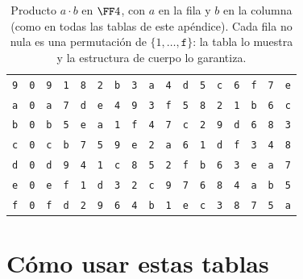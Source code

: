 \begin{table}[htbp]
\begin{tabular}{@{}c@{}c@{}c@{}c@{}c@{}c@{}c@{}c@{}c@{}c@{}c@{}c@{}c@{}c@{}c@{}c@{}c@{}}
\texttt{9} & \texttt{0} & \texttt{9} & \texttt{1} & \texttt{8} & \texttt{2} & \texttt{b} & \texttt{3} & \texttt{a} & \texttt{4} & \texttt{d} & \texttt{5} & \texttt{c} & \texttt{6} & \texttt{f} & \texttt{7} & \texttt{e}\\
\texttt{a} & \texttt{0} & \texttt{a} & \texttt{7} & \texttt{d} & \texttt{e} & \texttt{4} & \texttt{9} & \texttt{3} & \texttt{f} & \texttt{5} & \texttt{8} & \texttt{2} & \texttt{1} & \texttt{b} & \texttt{6} & \texttt{c}\\
\texttt{b} & \texttt{0} & \texttt{b} & \texttt{5} & \texttt{e} & \texttt{a} & \texttt{1} & \texttt{f} & \texttt{4} & \texttt{7} & \texttt{c} & \texttt{2} & \texttt{9} & \texttt{d} & \texttt{6} & \texttt{8} & \texttt{3}\\
\texttt{c} & \texttt{0} & \texttt{c} & \texttt{b} & \texttt{7} & \texttt{5} & \texttt{9} & \texttt{e} & \texttt{2} & \texttt{a} & \texttt{6} & \texttt{1} & \texttt{d} & \texttt{f} & \texttt{3} & \texttt{4} & \texttt{8}\\
\texttt{d} & \texttt{0} & \texttt{d} & \texttt{9} & \texttt{4} & \texttt{1} & \texttt{c} & \texttt{8} & \texttt{5} & \texttt{2} & \texttt{f} & \texttt{b} & \texttt{6} & \texttt{3} & \texttt{e} & \texttt{a} & \texttt{7}\\
\texttt{e} & \texttt{0} & \texttt{e} & \texttt{f} & \texttt{1} & \texttt{d} & \texttt{3} & \texttt{2} & \texttt{c} & \texttt{9} & \texttt{7} & \texttt{6} & \texttt{8} & \texttt{4} & \texttt{a} & \texttt{b} & \texttt{5}\\
\texttt{f} & \texttt{0} & \texttt{f} & \texttt{d} & \texttt{2} & \texttt{9} & \texttt{6} & \texttt{4} & \texttt{b} & \texttt{1} & \texttt{e} & \texttt{c} & \texttt{3} & \texttt{8} & \texttt{7} & \texttt{5} & \texttt{a}\\
\bottomrule
\end{tabular}
\caption{Producto $a\cdot b$ en $\FF4$, con $a$ en la fila y $b$ en la
columna (como en todas las tablas de este apéndice). Cada fila no
nula es una permutación de $\{1,\dots,\mathtt{f}\}$: la tabla lo
muestra y la estructura de cuerpo lo garantiza.}
\end{table}

\section{Cómo usar estas tablas}

